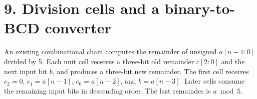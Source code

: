 \section{9. Division cells and a binary-to-BCD converter}
\begin{question}
An existing combinational chain computes the remainder of unsigned $a[n-1:0]$ divided by 5. Each unit cell receives a three-bit old remainder $c[2:0]$ and the next input bit $b$, and produces a three-bit new remainder. The first cell receives $c_2=0$, $c_1=a[n-1]$, $c_0=a[n-2]$, and $b=a[n-3]$. Later cells consume the remaining input bits in descending order. The last remainder is $a\bmod5$.
\end{question}
\begin{center}
\end{center}

